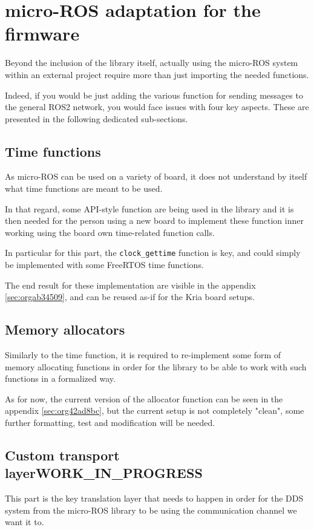 \documentclass[10pt]{article}
\begin{document}
\section{micro-ROS adaptation for the firmware}
\label{sec:orgc049075}
Beyond the inclusion of the library itself, actually using the micro-ROS system
within an external project require more than just importing the needed
functions.

Indeed, if you would be just adding the various function for sending messages to
the general ROS2 network, you would face issues with four key aspects.
These are presented in the following dedicated sub-sections.

\subsection{Time functions}
\label{sec:org7f2be1f}
As micro-ROS can be used on a variety of board, it does not understand by itself
what time functions are meant to be used.

In that regard, some API-style function are being
used in the library and it is then needed for the person using a new board
to implement these function inner working using the board own time-related
function calls.

In particular for this part, the \texttt{clock\_gettime} function is key, and could
simply be implemented with some FreeRTOS time functions.

The end result for these implementation are visible in the appendix \ref{sec:orgab34509},
and can be reused as-if for the Kria board setups.

\subsection{Memory allocators}
\label{sec:org6ceaf91}
Similarly to the time function, it is required to re-implement some form of memory allocating
functions in order for the library to be able to work with such functions in a formalized way.

As for now, the current version of the allocator function can be seen in the
appendix \ref{sec:org42ad8bc}, but the current setup is not
completely "clean", some further formatting, test and modification will be needed.

\subsection{Custom transport layer\hfill{}\textsc{WORK\_IN\_PROGRESS}}
\label{sec:orgbef8c5a}
This part is the key translation layer that needs to happen in order for the
DDS system from the micro-ROS library to be using the communication channel we
want it to.
\end{document}
